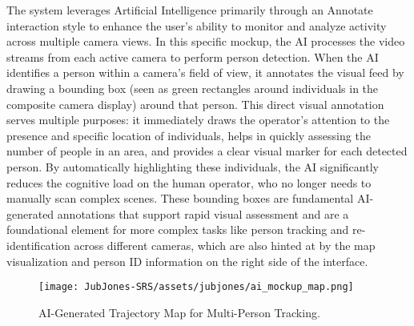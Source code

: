 The system leverages Artificial Intelligence primarily through an Annotate interaction style to enhance the user's ability to monitor and analyze activity across multiple camera views. In this specific mockup, the AI processes the video streams from each active camera to perform person detection.
When the AI identifies a person within a camera's field of view, it annotates the visual feed by drawing a bounding box (seen as green rectangles around individuals in the composite camera display) around that person. This direct visual annotation serves multiple purposes: it immediately draws the operator's attention to the presence and specific location of individuals, helps in quickly assessing the number of people in an area, and provides a clear visual marker for each detected person. By automatically highlighting these individuals, the AI significantly reduces the cognitive load on the human operator, who no longer needs to manually scan complex scenes. These bounding boxes are fundamental AI-generated annotations that support rapid visual assessment and are a foundational element for more complex tasks like person tracking and re-identification across different cameras, which are also hinted at by the map visualization and person ID information on the right side of the interface.

\begin{figure}[!htb]
    \centering
    \texttt{[image: JubJones-SRS/assets/jubjones/ai\_mockup\_map.png]}
    \caption{AI-Generated Trajectory Map for Multi-Person Tracking.}
    \label{fig:ai_mockup_map}
\end{figure}

